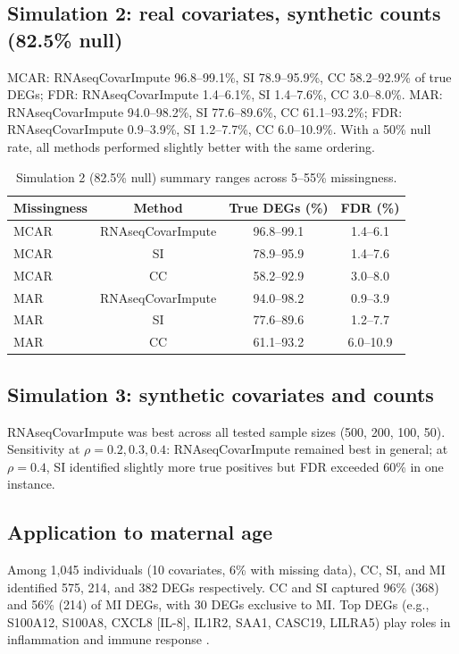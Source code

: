 \documentclass[11pt]{article}
\begin{document}
\subsection{Simulation 2: real covariates, synthetic counts (82.5\% null)}
MCAR: RNAseqCovarImpute 96.8--99.1\%, SI 78.9--95.9\%, CC 58.2--92.9\% of true DEGs; FDR: RNAseqCovarImpute 1.4--6.1\%, SI 1.4--7.6\%, CC 3.0--8.0\%. MAR: RNAseqCovarImpute 94.0--98.2\%, SI 77.6--89.6\%, CC 61.1--93.2\%; FDR: RNAseqCovarImpute 0.9--3.9\%, SI 1.2--7.7\%, CC 6.0--10.9\%. With a 50\% null rate, all methods performed slightly better with the same ordering.

\begin{table}[h]
\centering
\caption{Simulation 2 (82.5\% null) summary ranges across 5--55\% missingness.}
\begin{tabular}{lccc}
\toprule
Missingness & Method & True DEGs (\%) & FDR (\%) \\
\midrule
MCAR & RNAseqCovarImpute & 96.8--99.1 & 1.4--6.1 \\
MCAR & SI & 78.9--95.9 & 1.4--7.6 \\
MCAR & CC & 58.2--92.9 & 3.0--8.0 \\
MAR & RNAseqCovarImpute & 94.0--98.2 & 0.9--3.9 \\
MAR & SI & 77.6--89.6 & 1.2--7.7 \\
MAR & CC & 61.1--93.2 & 6.0--10.9 \\
\bottomrule
\end{tabular}
\end{table}

\subsection{Simulation 3: synthetic covariates and counts}
RNAseqCovarImpute was best across all tested sample sizes (500, 200, 100, 50). Sensitivity at $\rho=0.2, 0.3, 0.4$: RNAseqCovarImpute remained best in general; at $\rho=0.4$, SI identified slightly more true positives but FDR exceeded 60\% in one instance.

\subsection{Application to maternal age}
Among 1{,}045 individuals (10 covariates, 6\% with missing data), CC, SI, and MI identified 575, 214, and 382 DEGs respectively. CC and SI captured 96\% (368) and 56\% (214) of MI DEGs, with 30 DEGs exclusive to MI. Top DEGs (e.g., S100A12, S100A8, CXCL8 [IL-8], IL1R2, SAA1, CASC19, LILRA5) play roles in inflammation and immune response \citep{r17}.
\end{document}
